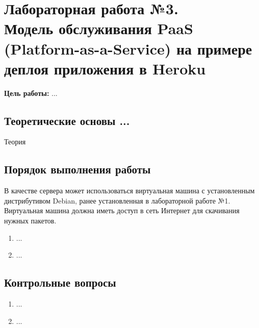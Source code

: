 \section[Лабораторная работа №3]{Лабораторная работа №3. \\
Модель обслуживания PaaS (Platform-as-a-Service) на примере деплоя приложения в Heroku}

\textbf{Цель работы:} ...

\subsection{Теоретические основы ...}

Теория

\subsection{Порядок выполнения работы}

В качестве сервера может использоваться виртуальная машина с установленным дистрибутивом Debian, ранее установленная в лабораторной работе №1.
Виртуальная машина должна иметь доступ в сеть Интернет для скачивания нужных пакетов.

\begin{enumerate}
    \item ...
    \item ...
\end{enumerate}

\subsection{Контрольные вопросы}
\begin{enumerate}
    \item ...
    \item ...
\end{enumerate}

\clearpage

